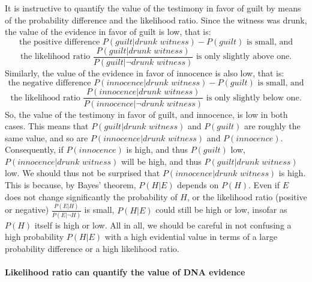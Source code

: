 \documentclass[10pt]{article}
\begin{document}
It is instructive to quantify the value of the testimony in favor of guilt by means of 
the probability difference and the likelihood ratio. Since the witness was drunk, the value of the evidence in favor of guilt is 
low, that is:
%
\[\text{the positive difference $P(\textit{guilt} | \textit{drunk witness}) - P(\textit{guilt})$ is small, and}\]
%
%
\[\text{the likelihood ratio $\frac{P(\textit{guilt} | \textit{drunk witness})}{P(\textit{guilt} | \neg\textit{drunk witness})}$ is only slightly above one}.\] 
%
Similarly, the value of the evidence in favor of innocence is also low, that is:
%
\[\text{the negative difference $P(\textit{innocence} | \textit{drunk witness}) - P(\textit{guilt})$ is small, and}\]
%
%
\[\text{the likelihood ratio $\frac{P(\textit{innocence} | \textit{drunk witness})}{P(\textit{innocence} | \neg\textit{drunk witness})}$ is only slightly below one}.\] 
%
So, the value of the testimony in favor of guilt, and innocence, is low 
in both cases. This means that $P(\textit{guilt} | \textit{drunk witness})$
and $P(\textit{guilt})$ are roughly the same value, and so are $P(\textit{innocence} | \textit{drunk witness})$ 
and $P(\textit{innocence})$. Consequently, if $P(\textit{innocence})$ is high, 
and thus $P(\textit{guilt})$ low, $P(\textit{innocence} | \textit{drunk witness})$ will 
be high, and thus $P(\textit{guilt} | \textit{drunk witness})$ low. %
We should thus not be surprised that $P(\textit{innocence} | \textit{drunk witness})$ is high. 
This is because, by Bayes' theorem, $P(H|E)$ depends on $P(H)$.  
Even if $E$ does not change significantly the probability of $H$, or the likelihood ratio (positive or negative) 
$\frac{P(E|H)}{P(E| \neg H)}$ is small, $P(H|E)$ could still be high or low, insofar as $P(H)$ itself is high or low. 
All in all, we should be careful in not confusing a high probability $P(H|E)$ with a high 
evidential value in terms of a large probability difference or a high likelihood ratio.


\paragraph{Likelihood ratio can quantify the value of DNA evidence}
\end{document}
